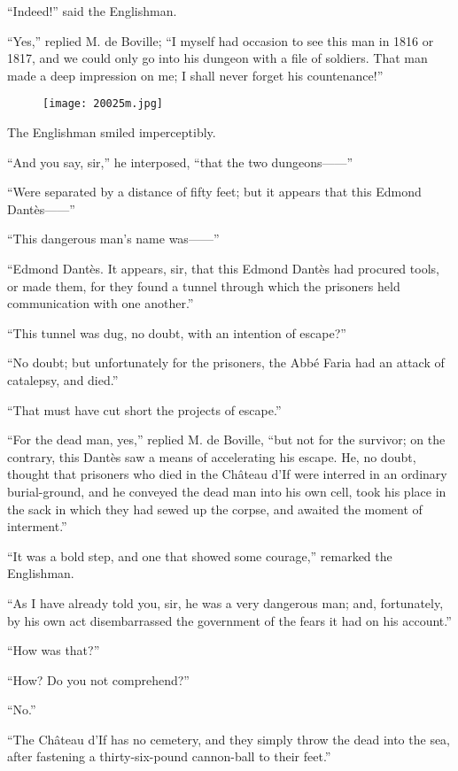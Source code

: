 “Indeed!” said the Englishman.

“Yes,” replied M. de Boville; “I myself had occasion to see this man in
1816 or 1817, and we could only go into his dungeon with a file of
soldiers. That man made a deep impression on me; I shall never forget
his countenance!”

\begin{figure}[h]
\texttt{[image: 20025m.jpg]}
\end{figure}

The Englishman smiled imperceptibly.

“And you say, sir,” he interposed, “that the two dungeons——”

“Were separated by a distance of fifty feet; but it appears that this
Edmond Dantès——”

“This dangerous man’s name was——”

“Edmond Dantès. It appears, sir, that this Edmond Dantès had procured
tools, or made them, for they found a tunnel through which the
prisoners held communication with one another.”

“This tunnel was dug, no doubt, with an intention of escape?”

“No doubt; but unfortunately for the prisoners, the Abbé Faria had an
attack of catalepsy, and died.”

“That must have cut short the projects of escape.”

“For the dead man, yes,” replied M. de Boville, “but not for the
survivor; on the contrary, this Dantès saw a means of accelerating his
escape. He, no doubt, thought that prisoners who died in the Château
d’If were interred in an ordinary burial-ground, and he conveyed the
dead man into his own cell, took his place in the sack in which they
had sewed up the corpse, and awaited the moment of interment.”

“It was a bold step, and one that showed some courage,” remarked the
Englishman.

“As I have already told you, sir, he was a very dangerous man; and,
fortunately, by his own act disembarrassed the government of the fears
it had on his account.”

“How was that?”

“How? Do you not comprehend?”

“No.”

“The Château d’If has no cemetery, and they simply throw the dead into
the sea, after fastening a thirty-six-pound cannon-ball to their feet.”


